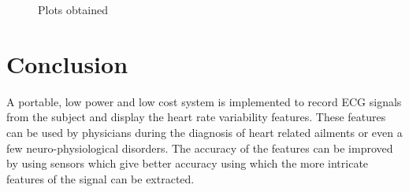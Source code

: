 \documentclass[11pt]{article}
\theoremstyle{definition}
\begin{document}
  \begin{figure}
    \centering
    \qquad
    \qquad
    \qquad
    \qquad
    \caption{Plots obtained}
    \label{fig:globfig}
  \end{figure}


  \newpage
  \section{Conclusion}
  A portable, low power and low cost system is implemented to record ECG signals from the subject and display the heart rate variability features. These features can be used by physicians during the diagnosis of heart related ailments or even a few neuro-physiological disorders. The accuracy of the features can be improved by using sensors which give better accuracy using which the more intricate features of the signal can be extracted.
  
\end{document}
